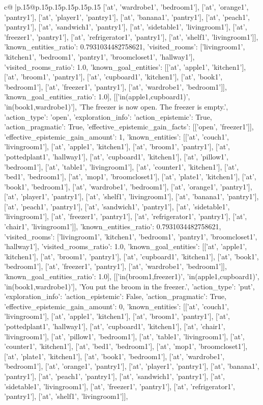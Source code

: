 \documentclass{article}
\begin{document}
{\begin{supertabular}{c@{$\;$}|p{.15\linewidth}@{}p{.15\linewidth}p{.15\linewidth}p{.15\linewidth}p{.15\linewidth}p{.15\linewidth}}
{{{['at', 'wardrobe1', 'bedroom1'], ['at', 'orange1', 'pantry1'], ['at', 'player1', 'pantry1'], ['at', 'banana1', 'pantry1'], ['at', 'peach1', 'pantry1'], ['at', 'sandwich1', 'pantry1'], ['at', 'sidetable1', 'livingroom1'], ['at', 'freezer1', 'pantry1'], ['at', 'refrigerator1', 'pantry1'], ['at', 'shelf1', 'livingroom1']], 'known_entities_ratio': 0.7931034482758621, 'visited_rooms': ['livingroom1', 'kitchen1', 'bedroom1', 'pantry1', 'broomcloset1', 'hallway1'], 'visited_rooms_ratio': 1.0, 'known_goal_entities': [['at', 'apple1', 'kitchen1'], ['at', 'broom1', 'pantry1'], ['at', 'cupboard1', 'kitchen1'], ['at', 'book1', 'bedroom1'], ['at', 'freezer1', 'pantry1'], ['at', 'wardrobe1', 'bedroom1']], 'known_goal_entities_ratio': 1.0}}], [['in(apple1,cupboard1)', 'in(book1,wardrobe1)'], 'The freezer is now open. The freezer is empty.', {'action_type': 'open', 'exploration_info': {'action_epistemic': True, 'action_pragmatic': True, 'effective_epistemic_gain_facts': [['open', 'freezer1']], 'effective_epistemic_gain_amount': 1, 'known_entities': [['at', 'couch1', 'livingroom1'], ['at', 'apple1', 'kitchen1'], ['at', 'broom1', 'pantry1'], ['at', 'pottedplant1', 'hallway1'], ['at', 'cupboard1', 'kitchen1'], ['at', 'pillow1', 'bedroom1'], ['at', 'table1', 'livingroom1'], ['at', 'counter1', 'kitchen1'], ['at', 'bed1', 'bedroom1'], ['at', 'mop1', 'broomcloset1'], ['at', 'plate1', 'kitchen1'], ['at', 'book1', 'bedroom1'], ['at', 'wardrobe1', 'bedroom1'], ['at', 'orange1', 'pantry1'], ['at', 'player1', 'pantry1'], ['at', 'shelf1', 'livingroom1'], ['at', 'banana1', 'pantry1'], ['at', 'peach1', 'pantry1'], ['at', 'sandwich1', 'pantry1'], ['at', 'sidetable1', 'livingroom1'], ['at', 'freezer1', 'pantry1'], ['at', 'refrigerator1', 'pantry1'], ['at', 'chair1', 'livingroom1']], 'known_entities_ratio': 0.7931034482758621, 'visited_rooms': ['livingroom1', 'kitchen1', 'bedroom1', 'pantry1', 'broomcloset1', 'hallway1'], 'visited_rooms_ratio': 1.0, 'known_goal_entities': [['at', 'apple1', 'kitchen1'], ['at', 'broom1', 'pantry1'], ['at', 'cupboard1', 'kitchen1'], ['at', 'book1', 'bedroom1'], ['at', 'freezer1', 'pantry1'], ['at', 'wardrobe1', 'bedroom1']], 'known_goal_entities_ratio': 1.0}}], [['in(broom1,freezer1)', 'in(apple1,cupboard1)', 'in(book1,wardrobe1)'], 'You put the broom in the freezer.', {'action_type': 'put', 'exploration_info': {'action_epistemic': False, 'action_pragmatic': True, 'effective_epistemic_gain_amount': 0, 'known_entities': [['at', 'couch1', 'livingroom1'], ['at', 'apple1', 'kitchen1'], ['at', 'broom1', 'pantry1'], ['at', 'pottedplant1', 'hallway1'], ['at', 'cupboard1', 'kitchen1'], ['at', 'chair1', 'livingroom1'], ['at', 'pillow1', 'bedroom1'], ['at', 'table1', 'livingroom1'], ['at', 'counter1', 'kitchen1'], ['at', 'bed1', 'bedroom1'], ['at', 'mop1', 'broomcloset1'], ['at', 'plate1', 'kitchen1'], ['at', 'book1', 'bedroom1'], ['at', 'wardrobe1', 'bedroom1'], ['at', 'orange1', 'pantry1'], ['at', 'player1', 'pantry1'], ['at', 'banana1', 'pantry1'], ['at', 'peach1', 'pantry1'], ['at', 'sandwich1', 'pantry1'], ['at', 'sidetable1', 'livingroom1'], ['at', 'freezer1', 'pantry1'], ['at', 'refrigerator1', 'pantry1'], ['at', 'shelf1', 'livingroom1']], }}}
\end{supertabular}}
\end{document}
